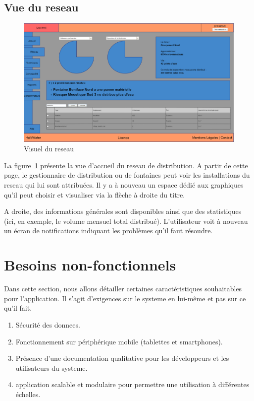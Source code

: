 \documentclass[a4paper, 11pt]{article}
\begin{document}
  \subsection{Vue du \gls{reseau}}
    \begin{figure}[H]
        \centering
        \includegraphics[width=.8\textwidth]{Cahier_des_Charges/reseau}
        \caption{Visuel du \gls{reseau}}
        \label{fig:network}
    \end{figure}
    La figure~\ref{fig:network} présente la vue d'accueil du \gls{reseau} de distribution. A partir de cette page, le gestionnaire de distribution ou de \glspl{fontaine} peut voir les installations du \gls{reseau} qui lui sont attribuées. Il y a à nouveau un espace dédié aux graphiques qu'il peut choisir et visualiser via la flèche à droite du titre.

    A droite, des informations générales sont disponibles ainsi que des statistiques (ici, en exemple, le volume mensuel total distribué).
    L'\gls{utilisateur} voit à nouveau un écran de notifications indiquant les problèmes qu'il faut résoudre.

\section{Besoins non-fonctionnels}
Dans cette section, nous allons détailler certaines caractéristiques souhaitables pour l'\gls{application}. Il s'agit d'exigences sur le \gls{systeme} en lui-même et pas sur ce qu'il fait.
\begin{enumerate}
  \item Sécurité des \glspl{donnee}.
  \item Fonctionnement sur périphérique mobile (tablettes et smartphones).
  \item Présence d'une documentation qualitative pour les développeurs et les \glspl{utilisateur} du \gls{systeme}.
  \item \gls{application} \gls{scalable} et \gls{modulaire} pour permettre une utilisation à différentes échelles.
\end{enumerate}
\end{document}
